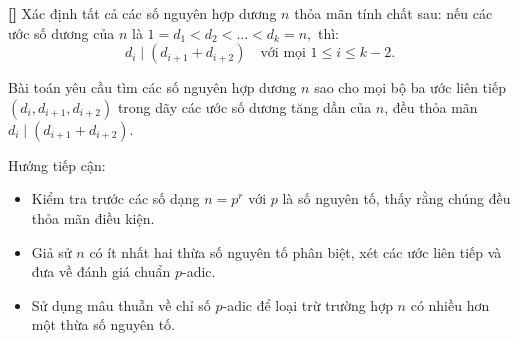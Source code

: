 \documentclass[../06-largest-exponent.tex]{subfiles}
\begin{document}
\begin{example*}\label{example:IMO-2023-P1}\textbf{[]}
    Xác định tất cả các số nguyên hợp dương \( n \) thỏa mãn tính chất sau: nếu các ước số dương của \( n \) là \(1 = d_1 < d_2 < \dots < d_k = n,\)
    thì:
    \[
        d_i \mid (d_{i+1} + d_{i+2}) \quad \text{với mọi } 1 \leq i \leq k - 2.
    \]
\end{example*}

\begin{story*}
    Bài toán yêu cầu tìm các số nguyên hợp dương \( n \) sao cho mọi bộ ba ước liên tiếp \( (d_i, d_{i+1}, d_{i+2}) \) trong dãy các ước số dương tăng dần của \( n \), đều thỏa mãn \( d_i \mid (d_{i+1} + d_{i+2}) \).

    Hướng tiếp cận:
    \begin{itemize}[topsep=0pt, partopsep=0pt, itemsep=0pt]
        \item Kiểm tra trước các số dạng \( n = p^r \) với \( p \) là số nguyên tố, thấy rằng chúng đều thỏa mãn điều kiện.
        \item Giả sử \( n \) có ít nhất hai thừa số nguyên tố phân biệt, xét các ước liên tiếp và đưa về đánh giá chuẩn \( p \)-adic.
        \item Sử dụng mâu thuẫn về chỉ số \( p \)-adic để loại trừ trường hợp \( n \) có nhiều hơn một thừa số nguyên tố.
    \end{itemize}
\end{story*}

\bigbreak
\end{document}
